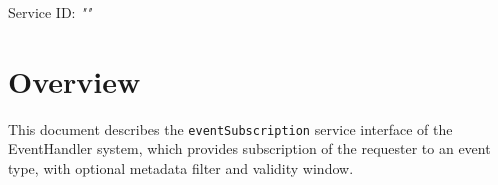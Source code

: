 \documentclass[a4paper]{arrowhead}
\begin{document}
\sloppy

\ArrowheadSetup

\begin{center}
  \vspace*{1cm}
  \huge{\arrowtitle}

  \vspace*{0.2cm}
  \LARGE{\arrowtype}
  \vspace*{1cm}

  \Large{Service ID: \textit{"\arrowid"}}

  \vspace*{\fill}


  \vspace*{1cm}
  \vspace*{\fill}

  \begin{abstract}
    This document describes the HTTP/1.1 protocol with TLS payload security and JSON payload encoding variant of the \texttt{eventSubscription} service of the EventHandler system.
  \end{abstract}

  \vspace*{1cm}
\end{center}

\newpage

\tableofcontents
\newpage

\section{Overview}
\label{sec:overview}

This document describes the \texttt{eventSubscription} service interface of the EventHandler system, which provides subscription of the requester to an event type, with optional metadata filter and validity window.
\end{document}
